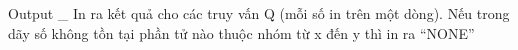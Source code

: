 Output
\_ In ra kết quả cho các truy vấn Q (mỗi số in trên một dòng). Nếu trong dãy số không tồn tại phần tử nào thuộc nhóm từ x đến y thì in ra “NONE”